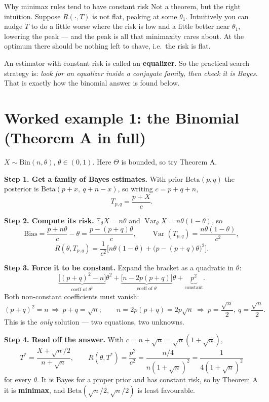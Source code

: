 \documentclass[11pt]{article}
\newcommand{\E}{\mathbb{E}}
\newcommand{\Var}{\operatorname{Var}}
\begin{document}
\begin{idea}{Why minimax rules tend to have constant risk}
Not a theorem, but the right intuition. Suppose $R(\cdot,T)$ is not flat, peaking at some
$\theta_1$. Intuitively you can nudge $T$ to do a little worse where the risk is low and a
little better near $\theta_1$, lowering the peak --- and the peak is all that minimaxity cares
about. At the optimum there should be nothing left to shave, i.e.\ the risk is flat.

An estimator with constant risk is called an \textbf{equalizer}. So the practical search
strategy is: \emph{look for an equalizer inside a conjugate family, then check it is Bayes.}
That is exactly how the binomial answer is found below.
\end{idea}

\section{Worked example 1: the Binomial (Theorem A in full)}

$X\sim\mathrm{Bin}(n,\theta)$, $\theta\in(0,1)$. Here $\Theta$ is bounded, so try Theorem A.

\textbf{Step 1. Get a family of Bayes estimates.} With prior $\mathrm{Beta}(p,q)$ the posterior
is $\mathrm{Beta}(p+x,\ q+n-x)$, so writing $c=p+q+n$,
\[
T_{p,q}=\frac{p+X}{c}.
\]

\textbf{Step 2. Compute its risk.} $\E_\theta X=n\theta$ and $\Var_\theta X=n\theta(1-\theta)$,
so
\[
\text{Bias}=\frac{p+n\theta}{c}-\theta=\frac{p-(p+q)\theta}{c},
\qquad
\Var(T_{p,q})=\frac{n\theta(1-\theta)}{c^{2}},
\]
\[
R(\theta,T_{p,q})=\frac{1}{c^{2}}\Big[n\theta(1-\theta)+\big(p-(p+q)\theta\big)^{2}\Big].
\]

\textbf{Step 3. Force it to be constant.} Expand the bracket as a quadratic in $\theta$:
\[
\underbrace{\big[(p+q)^{2}-n\big]}_{\text{coeff of }\theta^{2}}\theta^{2}
+\underbrace{\big[n-2p(p+q)\big]}_{\text{coeff of }\theta}\theta
+\underbrace{p^{2}}_{\text{constant}} .
\]
Both non-constant coefficients must vanish:
\[
(p+q)^{2}=n\ \Rightarrow\ p+q=\sqrt n;
\qquad
n=2p(p+q)=2p\sqrt n\ \Rightarrow\ p=\frac{\sqrt n}{2},\ q=\frac{\sqrt n}{2}.
\]
This is the \emph{only} solution --- two equations, two unknowns.

\textbf{Step 4. Read off the answer.} With $c=n+\sqrt n=\sqrt n(1+\sqrt n)$,
\[
\boxed{\ T^*=\frac{X+\sqrt n/2}{n+\sqrt n},\qquad
R(\theta,T^*)=\frac{p^{2}}{c^{2}}=\frac{n/4}{n(1+\sqrt n)^{2}}=\frac{1}{4(1+\sqrt n)^{2}}\ }
\]
for every $\theta$. It is Bayes for a proper prior and has constant risk, so by Theorem A it is
\textbf{minimax}, and $\mathrm{Beta}(\sqrt n/2,\sqrt n/2)$ is least favourable.
\end{document}
